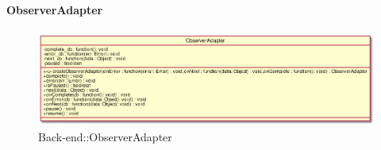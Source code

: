 \hypertarget{ObserverAdapter_label}{\paragraph{ObserverAdapter}}
\begin{figure}[h]
	\centering
	\includegraphics[width=\textwidth,height=\textheight,keepaspectratio]{images/ClassObserverAdapter.png}
	\caption{Back-end::ObserverAdapter}
\end{figure}
